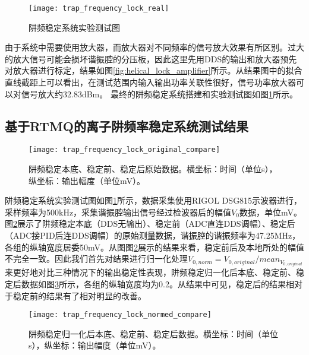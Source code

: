 \begin{figure}
    \centering
    \caption[阱频稳定系统实验测试图]{阱频稳定系统实验测试图\label{fig:trap_frequency_lock_real}}
    \texttt{[image: trap\_frequency\_lock\_real]}
\end{figure}


由于系统中需要使用放大器，而放大器对不同频率的信号放大效果有所区别。过大的放大信号可能会损坏谐振腔的分压板，因此这里先用DDS的输出和放大器预先对放大器进行标定，结果如图\ref{fig:helical_lock_amplifier}所示。从结果图中的拟合直线截距上可以看出，在测试范围内输入输出功率关联性很好，信号功率放大器可以对信号放大约32.83dBm。
最终的阱频稳定系统搭建和实验测试图如图\ref{fig:trap_frequency_lock_real}所示。


\subsection[基于RTMQ的离子阱频率稳定系统测试结果]{基于RTMQ的离子阱频率稳定系统测试结果}

\begin{figure}
    \centering
    \caption[阱频稳定本底、稳定前、稳定后原始数据]{阱频稳定本底、稳定前、稳定后原始数据。横坐标：时间（单位s），纵坐标：输出幅度（单位mV）。\label{fig:trap_frequency_lock_original_compare}}
    \texttt{[image: trap\_frequency\_lock\_original\_compare]}
\end{figure}



阱频稳定系统实验测试图如图\ref{fig:trap_frequency_lock_real}所示，数据采集使用RIGOL DSG815示波器进行，采样频率为500kHz，采集谐振腔输出信号经过检波器后的幅值$V_0$数据，单位mV。图\ref{fig:trap_frequency_lock_original_compare}展示了阱频稳定本底（DDS无输出）、稳定前（ADC直连DDS调幅）、稳定后（ADC接PID后连DDS调幅）的原始测量数据，谐振腔的谐振频率为47.25MHz，各组的纵轴宽度居委50mV。从图图\ref{fig:trap_frequency_lock_original_compare}展示的结果来看，稳定前后及本地所处的幅值不完全一致。因此我们首先对结果进行归一化处理$V_{0,norm}=V_{0,original}/mean_{V_{0,original}}$来更好地对比三种情况下的输出稳定性表现，阱频稳定归一化后本底、稳定前、稳定后数据如图\ref{fig:trap_frequency_lock_normed_compare}所示，各组的纵轴宽度均为0.2。从结果中可见，稳定后的结果相对于稳定前的结果有了相对明显的改善。

\begin{figure}
    \centering
    \caption[阱频稳定归一化后本底、稳定前、稳定后数据]{阱频稳定归一化后本底、稳定前、稳定后数据。横坐标：时间（单位s），纵坐标：输出幅度（单位mV）。\label{fig:trap_frequency_lock_normed_compare}}
    \texttt{[image: trap\_frequency\_lock\_normed\_compare]}
\end{figure}

